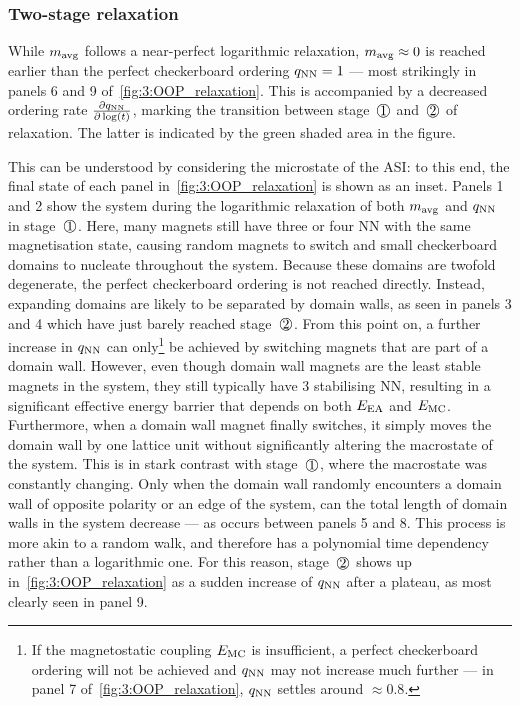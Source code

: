 \subsubsection{Two-stage relaxation}
While $m_\mathrm{avg}$ follows a near-perfect logarithmic relaxation, $m_\mathrm{avg} \approx 0$ is reached earlier than the perfect checkerboard ordering $q_\mathrm{NN} = 1$ --- most strikingly in panels 6 and 9 of~\cref{fig:3:OOP_relaxation}.
This is accompanied by a decreased ordering rate $\frac{\partial q_\mathrm{NN}}{\partial \log(t)}$, marking the transition between stage~$\circled{1}$ and~$\circled{2}$ of relaxation.
The latter is indicated by the green shaded area in the figure. \par
This can be understood by considering the microstate of the ASI: to this end, the final state of each panel in~\cref{fig:3:OOP_relaxation} is shown as an inset.
Panels 1 and 2 show the system during the logarithmic relaxation of both $m_\mathrm{avg}$ and $q_\mathrm{NN}$ in stage~$\circled{1}$.
Here, many magnets still have three or four NN with the same magnetisation state, causing random magnets to switch and small checkerboard domains to nucleate throughout the system.
Because these domains are twofold degenerate, the perfect checkerboard ordering is not reached directly.
Instead, expanding domains are likely to be separated by domain walls, as seen in panels 3 and 4 which have just barely reached stage~$\circled{2}$.
From this point on, a further increase in $q_\mathrm{NN}$ can only\footnote{
	If the magnetostatic coupling $E_\mathrm{MC}$ is insufficient, a perfect checkerboard ordering will not be achieved and $q_\mathrm{NN}$ may not increase much further --- in panel 7 of~\cref{fig:3:OOP_relaxation}, $q_\mathrm{NN}$ settles around $\approx 0.8$.
} be achieved by switching magnets that are part of a domain wall.
However, even though domain wall magnets are the least stable magnets in the system, they still typically have 3 stabilising NN, resulting in a significant effective energy barrier that depends on both $E_\mathrm{EA}$ and $E_\mathrm{MC}$.
Furthermore, when a domain wall magnet finally switches, it simply moves the domain wall by one lattice unit without significantly altering the macrostate of the system.
This is in stark contrast with stage~$\circled{1}$, where the macrostate was constantly changing.
Only when the domain wall randomly encounters a domain wall of opposite polarity or an edge of the system, can the total length of domain walls in the system decrease --- as occurs between panels 5 and 8.
This process is more akin to a random walk, and therefore has a polynomial time dependency rather than a logarithmic one.
For this reason, stage~$\circled{2}$ shows up in~\cref{fig:3:OOP_relaxation} as a sudden increase of $q_\mathrm{NN}$ after a plateau, as most clearly seen in panel 9. \par
